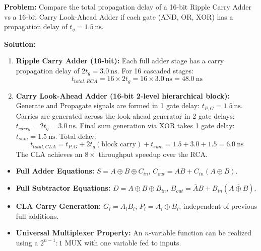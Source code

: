 \begin{examplebox}
\textbf{Problem:} Compare the total propagation delay of a 16-bit Ripple Carry Adder vs a 16-bit Carry Look-Ahead Adder if each gate (AND, OR, XOR) has a propagation delay of $t_g = \SI{1.5}{\nano\second}$.

\textbf{Solution:}
\begin{enumerate}
    \item \textbf{Ripple Carry Adder (16-bit):}
    Each full adder stage has a carry propagation delay of $2 t_g = \SI{3.0}{\nano\second}$.
    For 16 cascaded stages:
    \begin{equation}
    t_{total, RCA} = 16 \times 2 t_g = 16 \times \SI{3.0}{\nano\second} = \SI{48.0}{\nano\second}
    \end{equation}
    \item \textbf{Carry Look-Ahead Adder (16-bit 2-level hierarchical block):}
    Generate and Propagate signals are formed in 1 gate delay: $t_{P, G} = \SI{1.5}{\nano\second}$.
    Carries are generated across the look-ahead generator in 2 gate delays: $t_{carry} = 2 t_g = \SI{3.0}{\nano\second}$.
    Final sum generation via XOR takes 1 gate delay: $t_{sum} = \SI{1.5}{\nano\second}$.
    Total delay:
    \begin{equation}
    t_{total, CLA} = t_{P,G} + 2 t_g (\text{block carry}) + t_{sum} = 1.5 + 3.0 + 1.5 = \SI{6.0}{\nano\second}
    \end{equation}
    The CLA achieves an $8\times$ throughput speedup over the RCA.
\end{enumerate}
\end{examplebox}

\begin{takeawaybox}
\begin{itemize}
    \item \textbf{Full Adder Equations:} $S = A \oplus B \oplus C_{in}$, $C_{out} = AB + C_{in}(A \oplus B)$.
    \item \textbf{Full Subtractor Equations:} $D = A \oplus B \oplus B_{in}$, $B_{out} = \overline{A}B + B_{in}(\overline{A \oplus B})$.
    \item \textbf{CLA Carry Generation:} $G_i = A_i B_i$, $P_i = A_i \oplus B_i$, independent of previous full additions.
    \item \textbf{Universal Multiplexer Property:} An $n$-variable function can be realized using a $2^{n-1} : 1$ MUX with one variable fed to inputs.
\end{itemize}
\end{takeawaybox}
